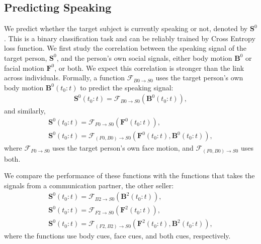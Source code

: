 \subsection{Predicting Speaking}
\label{subsection:ssp_pred_speak}

We predict whether the target subject is currently speaking or not, denoted by $\mathbf{S}^0$.  This is a binary classification task and can be reliably trained by Cross Entropy loss function. We first study the correlation between the speaking signal of the target person, $\mathbf{S}^0$, and the person's own social signals, either body motion $\mathbf{B}^0$ or facial motion $\mathbf{F}^0$, or both. We expect this correlation is stronger than the link across individuals. Formally, a function $\mathcal{F}_{B0\rightarrow S0}$ uses the target person's own body motion $\mathbf{B}^0(t_0:t)$ to predict the speaking signal:
\begin{gather}	
\mathbf{S}^0(t_0:t) = \mathcal{F}_{B0\rightarrow S0} \left( \mathbf{B}^0(t_0:t) \right),
\label{eq:speaking_0}
\end{gather}
and similarly,
\begin{gather}	
\mathbf{S}^0(t_0:t) = \mathcal{F}_{F0\rightarrow S0} \left( \mathbf{F}^0(t_0:t) \right),\\
\mathbf{S}^0(t_0:t) = \mathcal{F}_{(F0, B0)\rightarrow S0} \left( \mathbf{F}^0(t_0:t) , \mathbf{B}^0(t_0:t)\right),
\label{eq:speaking_0_facebody}
\end{gather}
where $\mathcal{F}_{F0\rightarrow S0}$ uses the target person's own face motion, and $\mathcal{F}_{(F0, B0)\rightarrow S0}$ uses both. 

We compare the performance of these functions with the functions that takes the signals from a communication partner, the other seller:
\begin{gather}	
\mathbf{S}^0(t_0:t) = \mathcal{F}_{B2\rightarrow S0} \left( \mathbf{B}^2(t_0:t) \right),\\
\mathbf{S}^0(t_0:t) = \mathcal{F}_{F2\rightarrow S0} \left( \mathbf{F}^2(t_0:t) \right),\\
\mathbf{S}^0(t_0:t) = \mathcal{F}_{(F2, B2)\rightarrow S0} \left( \mathbf{F}^2(t_0:t), \mathbf{B}^2(t_0:t) \right),
\label{eq:speaking_1}
\end{gather}
where the functions use body cues, face cues, and both cues, respectively. 

